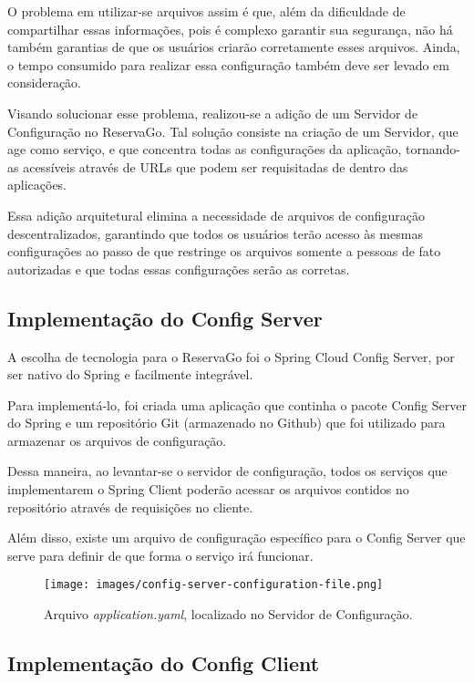 \documentclass[12pt, openright, oneside, a4paper, article,
  section=TITLE
]{abntex2}
\begin{document}
O problema em utilizar-se arquivos assim é que, além da dificuldade de compartilhar essas informações, pois é complexo garantir sua segurança, não há também garantias de que os usuários criarão corretamente esses arquivos. Ainda, o tempo consumido para realizar essa configuração também deve ser levado em consideração. 

Visando solucionar esse problema, realizou-se a adição de um Servidor de Configuração no ReservaGo. Tal solução consiste na criação de um Servidor, que age como serviço, e que concentra todas as configurações da aplicação, tornando-as acessíveis através de URLs que podem ser requisitadas de dentro das aplicações. 

Essa adição arquitetural elimina a necessidade de arquivos de configuração descentralizados, garantindo que todos os usuários terão acesso às mesmas configurações ao passo de que restringe os arquivos somente a pessoas de fato autorizadas e que todas essas configurações serão as corretas. 


\subsection{Implementação do Config Server}

A escolha de tecnologia para o ReservaGo foi o Spring Cloud Config Server, por ser nativo do Spring e facilmente integrável.  

Para implementá-lo, foi criada uma aplicação que continha o pacote Config Server do Spring e um repositório Git (armazenado no Github) que foi utilizado para armazenar os arquivos de configuração. 

Dessa maneira, ao levantar-se o servidor de configuração, todos os serviços que implementarem o Spring Client poderão acessar os arquivos contidos no repositório através de requisições no cliente. 

Além disso, existe um arquivo de configuração específico para o Config Server que serve para definir de que forma o serviço irá funcionar. 


\begin{figure}[htb]
  \begin{center}
    \texttt{[image: images/config-server-configuration-file.png]}
  \end{center}
  \caption{Arquivo \textit{application.yaml}, localizado no Servidor de Configuração.}
\end{figure}

\subsection{Implementação do Config Client}
\end{document}
